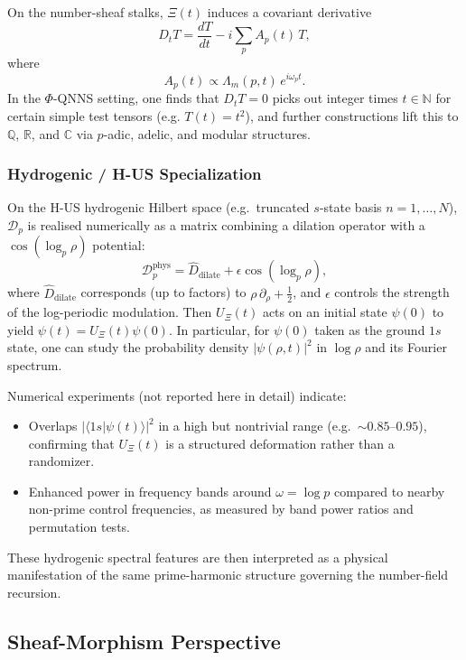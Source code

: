 \documentclass[11pt]{article}
\begin{document}
On the number-sheaf stalks, $\Xi(t)$ induces a covariant derivative
\[
  D_t T
    = \frac{dT}{dt} - i\sum_{p} A_p(t)\,T,
\]
where 
\[
  A_p(t)
    \propto \Lambda_m(p,t)\,e^{i\omega_p t}.
\]
In the $\Phi$-QNNS setting, one finds that $D_t T = 0$ picks out
integer times $t \in \mathbb{N}$ for certain simple test tensors (e.g.
$T(t) = t^2$), and further constructions lift this to $\mathbb{Q}$,
$\mathbb{R}$, and $\mathbb{C}$ via $p$-adic, adelic, and modular
structures.

\subsubsection{Hydrogenic / H-US Specialization}

On the H-US hydrogenic Hilbert space (e.g.\ truncated $s$-state basis
$n=1,\dots,N$), $\mathcal{D}_p$ is realised numerically as a matrix
combining a dilation operator with a $\cos(\log_p \rho)$ potential:
\[
  \mathcal{D}_p^{\text{phys}}
    = \hat D_{\text{dilate}} + \epsilon \cos(\log_p \rho),
\]
where $\hat D_{\text{dilate}}$ corresponds (up to factors) to
$\rho\,\partial_\rho + \tfrac12$, and $\epsilon$ controls the strength
of the log-periodic modulation. Then $U_\Xi(t)$ acts on an initial
state $\psi(0)$ to yield $\psi(t) = U_\Xi(t)\psi(0)$. In particular,
for $\psi(0)$ taken as the ground $1s$ state, one can study the
probability density $|\psi(\rho,t)|^2$ in $\log\rho$ and its Fourier
spectrum.

Numerical experiments (not reported here in detail) indicate:
\begin{itemize}
  \item Overlaps $|\langle 1s | \psi(t)\rangle|^2$ in a high but
  nontrivial range (e.g.\ $\sim 0.85$--$0.95$), confirming that
  $U_\Xi(t)$ is a structured deformation rather than a randomizer.

  \item Enhanced power in frequency bands around $\omega = \log p$
  compared to nearby non-prime control frequencies, as measured by
  band power ratios and permutation tests.
\end{itemize}
These hydrogenic spectral features are then interpreted as a physical
manifestation of the same prime-harmonic structure governing the
number-field recursion.

\subsection{Sheaf-Morphism Perspective}
\end{document}

